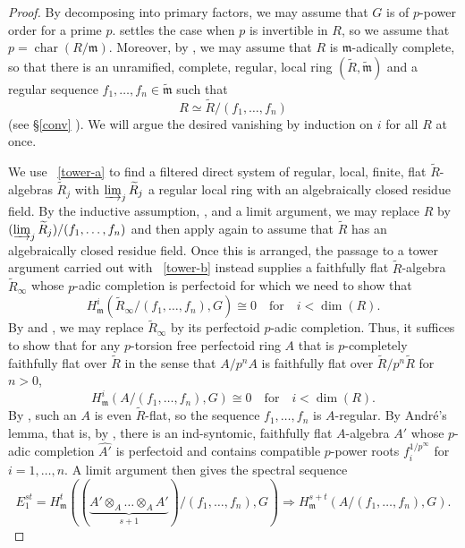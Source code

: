 \documentclass[11pt, reqno]{amsart}
\newcommand{\fm}{\mathfrak{m}}
\DeclareMathOperator{\Char}{char}		%
\newcommand{\wh}{\widehat}
\newcommand{\wt}{\widetilde}
\providecommand{\qxq}[1]{\quad\text{#1}\quad}
\newcommand{\be}{\begin{equation}}
\newcommand{\ee}{\end{equation}}
\numberwithin{equation}{numberingbase}
\theoremstyle{thms}
\theoremstyle{claims}
\theoremstyle{defs}
\theoremstyle{thms}
\theoremstyle{defs}
\theoremstyle{subsection-tweak}
\theoremstyle{subsection-tweak}
\begin{document}
\begin{proof} 
By decomposing into primary factors, we may assume that $G$ is of $p$-power order for a prime $p$.  settles the case when $p$ is invertible in $R$, so we assume that $p = \Char(R/\fm)$. Moreover, by , we may assume that $R$ is $\fm$-adically complete, so that there is an unramified, complete, regular, local ring $(\wt{R}, \wt{\fm})$ and a regular sequence $f_1, \dotsc, f_n \in \wt{\fm}$ such that
\[
R \simeq \wt{R}/(f_1, \dotsc, f_n)
\]
(see \S\ref{conv}%
). We will argue the desired vanishing by induction on $i$ for all $R$ at once. 

We use ~\ref{tower-a} to find a filtered direct system of regular, local, finite, flat $\wt{R}$-algebras $\wt{R}_j$ with $\varinjlim_j \wt{R}_j$ a regular local ring with an algebraically closed residue field. By the inductive assumption, , %
and a limit argument, we may replace $R$ by $(\varinjlim_j \wt{R}_j)/(f_1, \dotsc, f_n)$ and then apply  again to assume that $\wt{R}$ has an algebraically closed residue field. Once this is arranged, the passage to a tower argument carried out with ~\ref{tower-b} instead supplies a faithfully flat %
$\wt{R}$-algebra $\wt{R}_\infty$ whose $p$-adic completion is perfectoid %
for which we need to show that
\[
H^i_\fm(\wt{R}_\infty/(f_1, \dotsc, f_n), G) \cong 0 \qxq{for} i < \dim(R). 
\]
By %
and , we may replace $\wt{R}_\infty$ by its perfectoid 
$p$-adic completion. Thus, it suffices to show that for any $p$-torsion free perfectoid ring $A$ that is $p$-completely faithfully flat over $\wt{R}$ in the sense that $A/p^nA$ is faithfully flat over $\wt{R}/p^n\wt{R}$ for $n > 0$,
\be \label{ultimate-desire}
H^i_\fm(A/(f_1, \dotsc, f_n), G) \cong 0 \qxq{for} i < \dim(R). 
\ee
By , such an $A$ is even $\wt{R}$-flat, so the sequence $f_1,\ldots,f_n$ is $A$-regular. By Andr\'{e}'s lemma, that is, by , there is an ind-syntomic, faithfully flat $A$-algebra $A'$ whose $p$-adic completion $\wh{A'}$ is perfectoid and contains compatible $p$-power roots $f_i^{1/p^\infty}$ for $i = 1, \dotsc, n$. A limit argument then gives the spectral sequence
\[
E_1^{st} = H^t_\fm((\underbrace{A'\otimes_A \ldots\otimes_A A'}_{s + 1})/(f_1, \dotsc, f_n),G) \Rightarrow H^{s + t}_\fm(A/(f_1, \dotsc, f_n), G).
\]
\end{proof}
\end{document}
